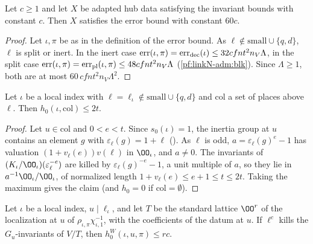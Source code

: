 \begin{proposition}\label{pf:linkN-adm:bbmain}
Let $c\ge1$ and let $X$ be adapted hub data satisfying the invariant bounds with constant $c$. Then $X$ satisfies the error
bound with constant $60c$.
\end{proposition}

\begin{proof}
Let $\iota,\pi$ be as in the definition of the error bound. As $\ell\notin\mathrm{small}\cup\{q,d\}$, $\ell$ is split or
inert. In the
inert case $\operatorname{err}(\iota,\pi)=\operatorname{err}_{\mathrm{dec}}(\iota)\le32cfnt^2n_V\Lambda$, in the split case
$\operatorname{err}(\iota,\pi)=\operatorname{err}_{\mathrm{pl}}(\iota,\pi)\le48cfnt^2n_V\Lambda$ (\cref{pf:linkN-adm:blk}). Since
$\Lambda\ge1$, both are at most $60\,cfnt^2n_V\Lambda^2$.
\end{proof}

\begin{lemma}\label{pf:linkN-adm:h0}
Let $\iota$ be a local index with $\ell=\ell_\iota\notin\mathrm{small}\cup\{q,d\}$ and $\mathrm{col}$ a set of places above
$\ell$. Then $h_0(\iota,\mathrm{col})\le2t$.
\end{lemma}

\begin{proof}
Let $u\in\mathrm{col}$ and $0<e<t$. Since $s_0(\iota)=1$, the inertia group at $u$ contains an element $g$ with
$\varepsilon_\ell(g)=1+\ell$ (). As $\ell$ is odd,
$a=\varepsilon_\ell(g)^e-1$ has valuation $(1+v_\ell(e))v(\ell)$ in $\OO_\iota$, and $a\ne0$. The invariants of
$(K_\iota/\OO_\iota)(\varepsilon_\ell^{-e})$ are killed by $\varepsilon_\ell(g)^{-e}-1$, a unit multiple of $a$, so they lie in
$a^{-1}\OO_\iota/\OO_\iota$, of normalized length $1+v_\ell(e)\le e+1\le t\le2t$. Taking the maximum gives the claim (and
$h_0=0$ if $\mathrm{col}=\emptyset$).
\end{proof}

\begin{lemma}\label{pf:linkN-adm:h0W}
Let $\iota$ be a local index, $u\mid\ell_\iota$, and let $T$ be the standard lattice $\OO^r$ of the localization at $u$ of
$\rho_{\iota,\pi}\chi_{\iota,1}^{-1}$, with the coefficients of the datum at $u$. If $\ell^c$ kills the $G_u$-invariants
of $V/T$, then $h^W_0(\iota,u,\pi)\le rc$.
\end{lemma}

